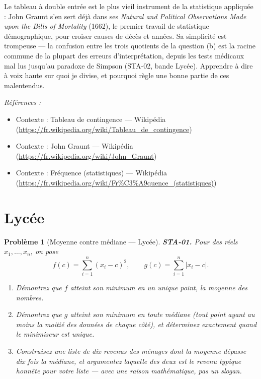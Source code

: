 \documentclass[11pt]{article}
\newtheorem{problem}{Problème}
\newenvironment{refs}{\par\small\noindent\emph{Références :}\begin{itemize}\setlength\itemsep{0pt}}{\end{itemize}\normalsize}
\begin{document}
\noindent Le tableau à double entrée est le plus vieil instrument de la statistique
appliquée : John Graunt s'en sert déjà dans ses \textit{Natural and Political Observations Made upon the
Bills of Mortality} (1662), le premier travail de statistique démographique, pour croiser causes
de décès et années. Sa simplicité est trompeuse --- la confusion entre les trois quotients de la
question (b) est la racine commune de la plupart des erreurs d'interprétation, depuis les tests
médicaux mal lus jusqu'au paradoxe de Simpson (STA-02, bande Lycée). Apprendre à dire à voix haute
\og{} sur quoi je divise, et pourquoi \fg{} règle une bonne partie de ces malentendus.

\begin{refs}
\item Contexte : Tableau de contingence --- Wikipédia (\url{https://fr.wikipedia.org/wiki/Tableau_de_contingence})
\item Contexte : John Graunt --- Wikipédia (\url{https://fr.wikipedia.org/wiki/John_Graunt})
\item Contexte : Fréquence (statistiques) --- Wikipédia (\url{https://fr.wikipedia.org/wiki/Fr%C3%A9quence_(statistiques)})
\end{refs}

\bigskip


\section*{Lycée}

\begin{problem}[{Moyenne contre médiane --- Lycée}]
\textbf{STA-01.} Pour des réels $ x_1, \dots, x_n $, on pose
\[ f(c) = \sum_{i=1}^{n} (x_i - c)^2 , \qquad g(c) = \sum_{i=1}^{n} |x_i - c| . \]
\begin{enumerate}
\item[(a)] Démontrez que $ f $ atteint son minimum en un unique point, la moyenne des nombres.
\item[(b)] Démontrez que $ g $ atteint son minimum en toute médiane (tout point ayant au moins la
moitié des données de chaque côté), et déterminez exactement quand le minimiseur est unique.
\item[(c)] Construisez une liste de dix \og{} revenus des ménages \fg{} dont la moyenne dépasse dix fois la
médiane, et argumentez laquelle des deux est le \og{} revenu typique \fg{} honnête pour votre liste ---
avec une raison mathématique, pas un slogan.
\end{enumerate}

\end{problem}
\end{document}
